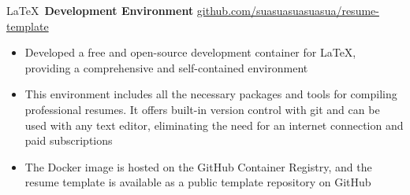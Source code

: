 \documentclass[11pt]{article}       %
\begin{document}
\LaTeX \, \textbf{Development Environment} \hfill \href{https://github.com/suasuasuasuasua/resume-template}{github.com/suasuasuasuasua/resume-template} \\
\vspace{-9pt}
\begin{itemize}
  \item Developed a free and open-source development container for \LaTeX,
        providing a comprehensive and self-contained environment
  \item This environment includes all the necessary packages and tools
        for compiling professional resumes. It offers built-in version control
        with git and can be used with any text editor, eliminating the need
        for an internet connection and paid subscriptions
  \item The Docker image is hosted on the GitHub Container Registry, and the
        resume template is available as a public template repository on GitHub
\end{itemize}
\end{document}

